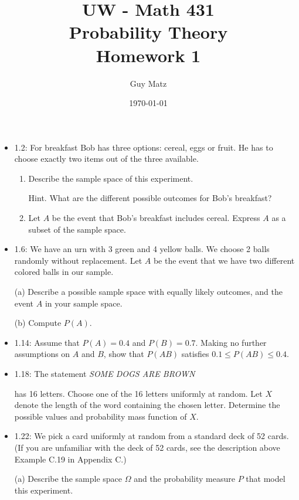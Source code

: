 \documentclass[10pt]{article}
\title{UW - Math 431 \\
Probability Theory \\
Homework 1}
\author{Guy Matz}
\date{\today}
\begin{document}
\maketitle

\begin{itemize}

\item 1.2: For breakfast Bob has three options: cereal, eggs or fruit. He has to choose exactly two items out of the three available.

\begin{enumerate}
  \item  Describe the sample space of this experiment.

Hint. What are the different possible outcomes for Bob's breakfast?

  \item  Let $A$ be the event that Bob's breakfast includes cereal. Express $A$ as a subset of the sample space.

\end{enumerate}

\hfill \break
\item 1.6: We have an urn with 3 green and 4 yellow balls. We choose 2 balls randomly without replacement. Let $A$ be the event that we have two different colored balls in our sample.

(a) Describe a possible sample space with equally likely outcomes, and the event $A$ in your sample space.

(b) Compute $P(A)$.

\hfill \break
\item 1.14: Assume that $P(A)=0.4$ and $P(B)=0.7$. Making no further assumptions on $A$ and $B$, show that $P(A B)$ satisfies $0.1 \leq P(A B) \leq 0.4$.

\hfill \break
\item 1.18: The statement \textit{SOME DOGS ARE BROWN}

has 16 letters. Choose one of the 16 letters uniformly at random. Let $X$ denote the length of the word containing the chosen letter. Determine the possible values and probability mass function of $X$.

\hfill \break
\item 1.22: We pick a card uniformly at random from a standard deck of 52 cards. (If you are unfamiliar with the deck of 52 cards, see the description above Example C.19 in Appendix C.)

(a) Describe the sample space $\Omega$ and the probability measure $P$ that model this experiment.


\end{itemize}
\end{document}
